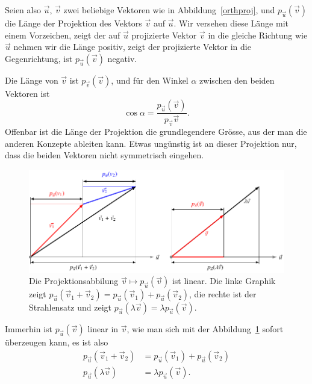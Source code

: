 Seien also $\vec u$, $\vec v$ zwei beliebige Vektoren wie in Abbildung~\ref{orthproj}, und $p_{\vec u}(\vec v)$
die Länge der Projektion des Vektors $\vec v$ auf $\vec u$.
Wir versehen diese Länge mit einem Vorzeichen, zeigt der auf $\vec u$
projizierte Vektor $\vec v$ in die gleiche Richtung wie $\vec u$
nehmen wir die Länge positiv, zeigt der projizierte Vektor in die
Gegenrichtung, ist $p_{\vec u}(\vec v)$ negativ.

Die Länge von $\vec v$ ist $p_{\vec v}(\vec v)$, und für den Winkel
$\alpha$ zwischen den beiden Vektoren ist
\begin{equation}
\cos \alpha = \frac{p_{\vec u}(\vec v)}{p_{\vec v}{\vec v}}.
\label{zwischenwinkel}
\end{equation}
Offenbar ist die Länge der Projektion die grundlegendere Grösse,
aus der man die anderen Konzepte ableiten kann.
Etwas ungünstig ist an dieser Projektion nur, dass die beiden Vektoren nicht
symmetrisch eingehen.
\begin{figure}
\centering
\includegraphics{4/images/linearitaet.pdf}
\caption{Die Projektionsabbilung
$\vec{v}\mapsto p_{\vec{u}}(\vec{v})$
ist linear. Die linke Graphik zeigt
$p_{\vec{u}}(\vec{v}_1+\vec{v}_2)
=
p_{\vec{u}}(\vec{v}_1)+p_{\vec{u}}(\vec{v}_2)$,
die rechte ist der Strahlensatz und zeigt
$p_{\vec{u}}(\lambda\vec{v})=\lambda p_{\vec{u}}(\vec{v})$.
\label{projektionlinearitaet}}
\end{figure}
Immerhin ist $p_{\vec u}(\vec v)$ linear in $\vec v$, wie man
sich mit der Abbildung~\ref{projektionlinearitaet}
sofort überzeugen kann, es ist also
\begin{align*}
p_{\vec u}(\vec v_1+\vec v_2)&=p_{\vec u}(\vec v_1)+p_{\vec u}(\vec v_2)\\
p_{\vec u}(\lambda \vec v)&=\lambda p_{\vec u}(\vec v).
\end{align*}

%
%
